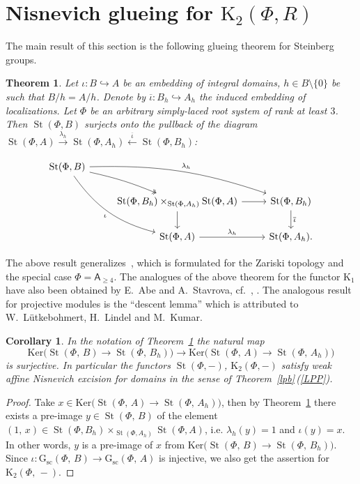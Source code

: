 \documentclass[oneside, 11pt]{amsart}
\numberwithin{equation}{section}
\newtheorem{theorem}[lemma]{Theorem}
\newtheorem{corollary}[lemma]{Corollary}
\newcommand{\K}{{\mathrm{K}}}
\newcommand{\St}{\mathop{\mathrm{St}}\nolimits}
\theoremstyle{definition}
\theoremstyle{definition}
\theoremstyle{remark}
\newcommand{\rA}{\mathsf{A}}
\begin{document}
\section{Nisnevich glueing for \texorpdfstring{$\K_2(\Phi, R)$}{K2(Ф,R)}} \label{sec:patching}
The main result of this section is the following glueing theorem for Steinberg groups.
\begin{theorem}\label{glueing}
Let $\iota\colon B \hookrightarrow A$ be an embedding of integral domains, $h\in B \setminus \{0\}$ be such that $B / h = A / h$. Denote by $\overline\iota\colon B_h\hookrightarrow A_h$ the induced embedding of localizations. Let $\Phi$ be an arbitrary simply-laced root system of rank at least $3$.
Then $\St(\Phi, B)$ surjects onto the pullback of the diagram 
$\St(\Phi, A) \xrightarrow{\lambda_h} \St(\Phi, A_{h})\xleftarrow{\overline{\iota}}\St(\Phi, B_h)$:

 \[ \begin{tikzcd}
 \St(\Phi, B)\ar[two heads, bend left=5]{rd}\ar[bend left=10]{rrd}{\lambda_h}\ar["\iota"', bend right=20]{rdd}&&\\
&\St(\Phi, B_h)\times_{\St(\Phi, A_{h})}\St(\Phi, A)\ar{r}\ar{d}&\St(\Phi, B_h)\ar{d}{\overline{\iota}}\\
&\St(\Phi, A)\ar{r}{\lambda_{h}}&\St(\Phi, A_{h}).
\end{tikzcd} \]
\end{theorem}

The above result generalizes~\cite[Proposition~1.4]{Tu83}, which is formulated for the Zariski topology and the special case $\Phi=\rA_{\geq 4}$.
The analogues of the above theorem for the functor $\K_1$ have also been obtained by E.~Abe and A.~Stavrova, cf.~\cite[Lemma~3.7]{Abe83}, \cite[Lemma~3.4]{Sta14}.
The analogous result for projective modules is the ``descent lemma'' \cite[Lemma~4.7]{Bh99} which is attributed to W.~L\"utkebohmert, H.~Lindel and M.~Kumar. 

\begin{corollary}
In the notation of Theorem~\ref{glueing} the natural map
$$
\mathrm{Ker}\big(\St(\Phi,\,B)\rightarrow\St(\Phi,\,B_h)\big)\rightarrow\mathrm{Ker}\big(\St(\Phi,\,A)\rightarrow\St(\Phi,\,A_h)\big)
$$
is surjective. In particular the functors $\St(\Phi, -)$, $\K_2(\Phi, -)$ satisfy weak affine Nisnevich excision for domains in the sense of Theorem~\ref{lpb}\,(\ref{LPP}).
\end{corollary}
\begin{proof}
Take $x\in\mathrm{Ker}\big(\St(\Phi,\,A)\rightarrow\St(\Phi,\,A_h)\big)$, then by Theorem~\ref{glueing} there exists a pre-image $y\in\St(\Phi,\,B)$ of the element $(1,\,x)\in\St(\Phi, B_h)\times_{\St(\Phi, A_{h})}\St(\Phi, A)$, i.e. $\lambda_h(y)=1$ and $\iota(y)=x$. In other words, $y$ is a pre-image of $x$ from $\mathrm{Ker}\big(\St(\Phi,\,B)\rightarrow\St(\Phi,\,B_h)\big)$. Since $\iota\colon\mathrm{G_{sc}}(\Phi,\,B)\rightarrow\mathrm{G_{sc}}(\Phi,\,A)$ is injective, we also get the assertion for $\mathrm K_2(\Phi,\,-)$.
\end{proof}
\end{document}
